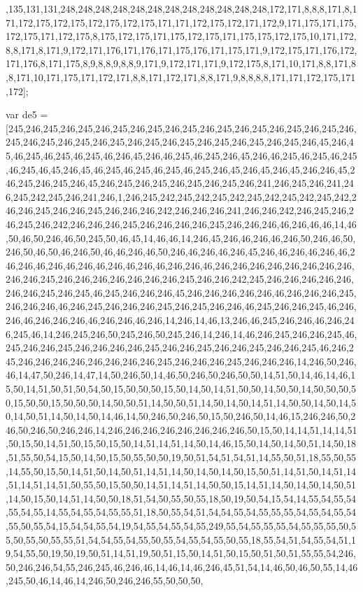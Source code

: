 ,135,131,131,248,248,248,248,248,248,248,248,248,248,248,248,172,171,8,8,8,171,8,171,172,175,172,175,172,175,172,175,171,171,172,175,172,171,172,9,171,175,171,175,172,175,171,172,175,8,175,172,175,171,175,172,175,171,175,175,172,175,10,171,172,8,8,171,8,171,9,172,171,176,171,176,171,175,176,171,175,171,9,172,175,171,176,172,171,176,8,171,175,8,9,8,8,9,8,8,9,171,9,172,171,171,9,172,175,8,171,10,171,8,8,171,8,8,171,10,171,175,171,172,171,8,8,171,172,171,8,8,171,9,8,8,8,8,171,171,172,175,171,172];

var de5 = [245,246,245,246,245,246,245,246,245,246,245,246,245,246,245,246,245,246,245,246,245,246,245,246,245,246,245,246,245,246,245,246,245,246,245,246,245,246,45,246,45,46,245,46,245,46,245,46,246,45,246,46,245,46,245,246,45,246,46,245,46,245,46,245,46,245,46,45,246,45,46,245,46,245,46,245,46,245,246,45,246,45,246,45,246,246,45,246,245,246,245,246,45,246,245,246,245,246,245,246,245,246,241,246,245,246,241,246,245,242,245,246,241,246,1,246,245,242,245,242,245,242,245,242,245,242,245,242,246,246,245,246,246,245,246,246,246,242,246,246,246,241,246,246,242,246,245,246,246,245,246,242,246,246,246,245,246,246,246,246,245,246,246,246,46,246,46,46,14,46,50,46,50,246,46,50,245,50,46,45,14,46,46,14,246,45,246,46,246,46,246,50,246,46,50,246,50,46,50,46,246,50,46,46,246,46,50,246,46,246,46,246,45,246,46,246,46,246,46,246,246,46,246,46,246,46,246,46,246,46,246,246,46,246,246,246,246,246,246,246,246,246,246,245,246,246,246,246,246,246,246,245,246,246,242,245,246,246,246,246,246,246,246,245,246,245,46,245,246,246,246,45,246,246,246,246,246,46,246,246,246,245,246,246,246,46,246,245,246,246,246,245,246,245,246,246,46,245,246,246,245,46,246,246,46,246,246,246,46,246,246,46,246,14,246,14,46,13,246,46,245,246,246,46,246,246,245,46,14,246,245,246,50,245,246,50,245,246,14,246,14,46,246,245,246,246,245,46,245,246,246,245,246,246,246,246,245,246,246,245,246,246,245,246,246,245,46,246,245,246,246,246,246,246,246,246,246,245,246,246,246,245,246,246,246,14,246,50,246,46,14,47,50,246,14,47,14,50,246,50,14,46,50,246,50,246,50,50,14,51,50,14,46,14,46,15,50,14,51,50,51,50,54,50,15,50,50,50,15,50,14,50,14,51,50,50,14,50,50,14,50,50,50,50,15,50,50,15,50,50,50,14,50,50,51,14,50,50,51,14,50,14,50,14,51,14,50,50,14,50,14,50,14,50,51,14,50,14,50,14,46,14,50,246,50,246,50,15,50,246,50,14,46,15,246,246,50,246,50,246,50,246,246,14,246,246,246,246,246,246,246,246,50,15,50,14,14,51,14,14,51,50,15,50,14,51,50,15,50,15,50,14,51,14,51,14,50,14,46,15,50,14,50,14,50,51,14,50,18,51,55,50,54,15,50,14,50,15,50,55,50,50,19,50,51,54,51,54,51,14,55,50,51,18,55,50,55,14,55,50,15,50,14,51,50,14,50,51,14,51,14,50,14,50,14,50,15,50,51,14,51,50,14,51,14,51,14,51,14,51,50,55,50,15,50,50,14,51,14,51,14,50,50,15,14,51,14,50,14,50,14,50,51,14,50,15,50,14,51,14,50,50,18,51,54,50,55,50,55,18,50,19,50,54,15,54,14,55,54,55,54,55,54,55,14,55,54,55,54,55,55,51,18,50,55,54,51,54,54,55,54,55,55,55,54,55,54,55,54,55,50,55,54,15,54,54,55,54,19,54,55,54,55,54,55,249,55,54,55,55,55,54,55,55,55,50,55,50,55,50,55,55,51,54,54,55,54,55,50,55,54,55,54,55,50,55,18,55,54,51,54,55,54,51,19,54,55,50,19,50,19,50,51,14,51,19,50,51,15,50,14,51,50,15,50,51,50,51,55,55,54,246,50,246,246,54,55,246,245,46,246,46,14,46,14,46,246,45,51,54,14,46,50,46,50,55,14,46,245,50,46,14,46,14,246,50,246,246,55,50,50,50,